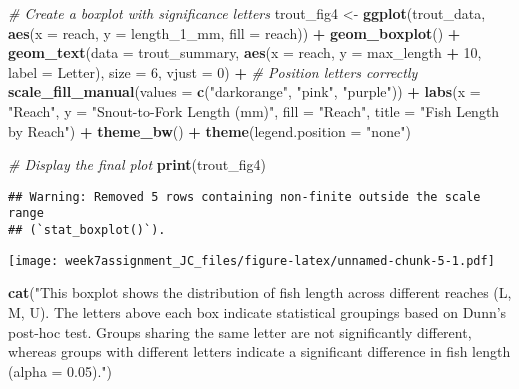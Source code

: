 \documentclass[
]{article}
\newenvironment{Shaded}{\begin{snugshade}}{\end{snugshade}}
\newcommand{\AttributeTok}[1]{\textcolor[rgb]{0.13,0.29,0.53}{#1}}
\newcommand{\CommentTok}[1]{\textcolor[rgb]{0.56,0.35,0.01}{\textit{#1}}}
\newcommand{\DecValTok}[1]{\textcolor[rgb]{0.00,0.00,0.81}{#1}}
\newcommand{\FunctionTok}[1]{\textcolor[rgb]{0.13,0.29,0.53}{\textbf{#1}}}
\newcommand{\NormalTok}[1]{#1}
\newcommand{\OtherTok}[1]{\textcolor[rgb]{0.56,0.35,0.01}{#1}}
\newcommand{\SpecialCharTok}[1]{\textcolor[rgb]{0.81,0.36,0.00}{\textbf{#1}}}
\newcommand{\StringTok}[1]{\textcolor[rgb]{0.31,0.60,0.02}{#1}}
\begin{document}
\begin{Shaded}
\begin{Highlighting}[]
\CommentTok{\# Create a boxplot with significance letters}
\NormalTok{trout\_fig4 }\OtherTok{\textless{}{-}} \FunctionTok{ggplot}\NormalTok{(trout\_data, }\FunctionTok{aes}\NormalTok{(}\AttributeTok{x =}\NormalTok{ reach, }\AttributeTok{y =}\NormalTok{ length\_1\_mm, }\AttributeTok{fill =}\NormalTok{ reach)) }\SpecialCharTok{+}
  \FunctionTok{geom\_boxplot}\NormalTok{() }\SpecialCharTok{+}
  \FunctionTok{geom\_text}\NormalTok{(}\AttributeTok{data =}\NormalTok{ trout\_summary, }\FunctionTok{aes}\NormalTok{(}\AttributeTok{x =}\NormalTok{ reach, }\AttributeTok{y =}\NormalTok{ max\_length }\SpecialCharTok{+} \DecValTok{10}\NormalTok{, }\AttributeTok{label =}\NormalTok{ Letter), }
            \AttributeTok{size =} \DecValTok{6}\NormalTok{, }\AttributeTok{vjust =} \DecValTok{0}\NormalTok{) }\SpecialCharTok{+}  \CommentTok{\# Position letters correctly}
  \FunctionTok{scale\_fill\_manual}\NormalTok{(}\AttributeTok{values =} \FunctionTok{c}\NormalTok{(}\StringTok{"darkorange"}\NormalTok{, }\StringTok{"pink"}\NormalTok{, }\StringTok{"purple"}\NormalTok{)) }\SpecialCharTok{+}
  \FunctionTok{labs}\NormalTok{(}\AttributeTok{x =} \StringTok{"Reach"}\NormalTok{, }\AttributeTok{y =} \StringTok{"Snout{-}to{-}Fork Length (mm)"}\NormalTok{, }\AttributeTok{fill =} \StringTok{"Reach"}\NormalTok{,}
       \AttributeTok{title =} \StringTok{"Fish Length by Reach"}\NormalTok{) }\SpecialCharTok{+}
  \FunctionTok{theme\_bw}\NormalTok{() }\SpecialCharTok{+}
  \FunctionTok{theme}\NormalTok{(}\AttributeTok{legend.position =} \StringTok{"none"}\NormalTok{)}

\CommentTok{\# Display the final plot}
\FunctionTok{print}\NormalTok{(trout\_fig4)}
\end{Highlighting}
\end{Shaded}

\begin{verbatim}
## Warning: Removed 5 rows containing non-finite outside the scale range
## (`stat_boxplot()`).
\end{verbatim}

\texttt{[image: week7assignment\_JC\_files/figure-latex/unnamed-chunk-5-1.pdf]}

\begin{Shaded}
\begin{Highlighting}[]
\FunctionTok{cat}\NormalTok{(}\StringTok{"This boxplot shows the distribution of fish length across different reaches (L, M, U). The letters above each box indicate statistical groupings based on Dunn’s post{-}hoc test. Groups sharing the same letter are not significantly different, whereas groups with different letters indicate a significant difference in fish length (alpha = 0.05)."}\NormalTok{)}
\end{Highlighting}
\end{Shaded}
\end{document}
